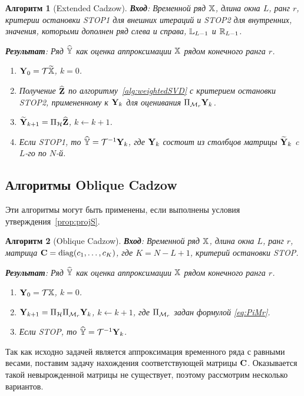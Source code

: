 \documentclass[12pt,a4paper,fleqn,leqno]{article}
\newtheorem{algorithm}{Алгоритм}%
\begin{document}
\begin{algorithm}[Extended Cadzow]
\textbf{Вход}: Временной ряд $\mathbb{X}$, длина окна $L$, ранг $r$,
критерии остановки STOP1 для внешних итераций и STOP2 для внутренних,
значения, которыми дополнен ряд слева и справа, $\mathbb{L}_{L-1}$ и $\mathbb{R}_{L-1}$.

\textbf{Результат}:
Ряд $\widehat{\mathbb{Y}}$ как оценка аппроксимации $\mathbb{X}$ рядом конечного ранга $r$.

\begin{enumerate}
\item
$\mathbf{Y}_0 = \mathcal{T} \widetilde{\mathbb{X}}$, $k=0$.
\item
Получение $\widehat{\mathbf{Z}}$ по алгоритму~\ref{alg:weightedSVD} с критерием остановки STOP2, примененному к $\mathbf{Y}_k$ для оценивания $\Pi_{\mathcal{M}_r} \mathbf{Y}_{k}$.
\item
$\widetilde{\mathbf{Y}}_{k+1} = \Pi_{\mathcal{H}}  \widehat{\mathbf{Z}}$, $k\leftarrow k+1$.
\item
Если STOP1, то $\widehat{\mathbb{Y}} = \mathcal{T}^{-1} \mathbf{Y}_k$, где $\mathbf{Y}_k$ состоит из столбцов матрицы $\widetilde{\mathbf{Y}}_{k}$
c $L$-го по $N$-й.
\end{enumerate}
\end{algorithm}

\subsection{Алгоритмы Oblique Cadzow}

Эти алгоритмы могут быть применены, если выполнены условия утверждения~\ref{prop:projS}.

\begin{algorithm}[Oblique Cadzow]
\label{alg:obliqueCadzow}
\textbf{Вход}: Временной ряд $\mathbb{X}$, длина окна $L$, ранг $r$, матрица $\mathbf{C}=\mathop{\mathrm{diag}}(c_1,\ldots, c_K)$, где $K=N-L+1$,
критерий остановки STOP.

\textbf{Результат}:
Ряд $\widehat{\mathbb{Y}}$ как оценка аппроксимации $\mathbb{X}$ рядом конечного ранга $r$.

\begin{enumerate}
\item
$\mathbf{Y}_0 = \mathcal{T} \mathbb{X}$, $k=0$.
\item
$\mathbf{Y}_{k+1} = \Pi_{\mathcal{H}}  \Pi_{\mathcal{M}_r} \mathbf{Y}_{k}$, $k\leftarrow k+1$, где 
$\Pi_{\mathcal{M}_r}$ задан формулой \eqref{eq:PiMr}.
\item
Если STOP, то $\widehat{\mathbb{Y}} = \mathcal{T}^{-1} \mathbf{Y}_k$.
\end{enumerate}
\end{algorithm}


Так как исходно задачей является аппроксимация временного ряда с равными весами, поставим задачу нахождения соответствующей матрицы $\mathbf{C}$.
Оказывается такой невырожденной матрицы не существует, поэтому рассмотрим несколько вариантов.
\end{document}
